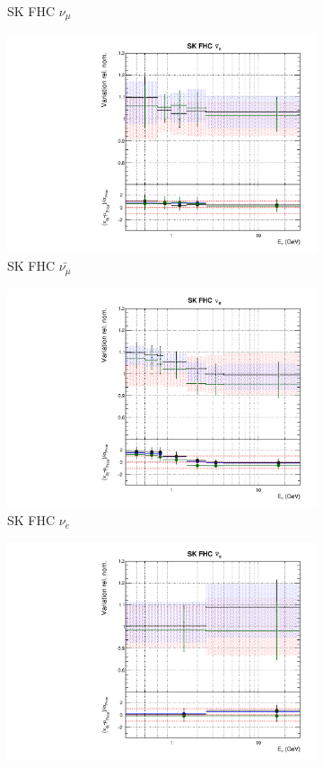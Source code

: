 \begin{figure}
\begin{subfigure}{0.45\textwidth}
  \caption{SK FHC $\nu_{\mu}$}
\end{subfigure}
\begin{subfigure}{0.45\textwidth}
  \centering
  \includegraphics[width=0.75\linewidth]{figs/newolddatafitsflux_9}
  \caption{SK FHC $\bar{\nu_{\mu}}$}
\end{subfigure}
\begin{subfigure}{0.45\textwidth}
  \centering
  \includegraphics[width=0.75\linewidth]{figs/newolddatafitsflux_10}
  \caption{SK FHC $\nu_{e}$}
\end{subfigure}
\begin{subfigure}{0.45\textwidth}
  \centering
  \includegraphics[width=0.75\linewidth]{figs/newolddatafitsflux_11}

\end{subfigure}
\end{figure}
